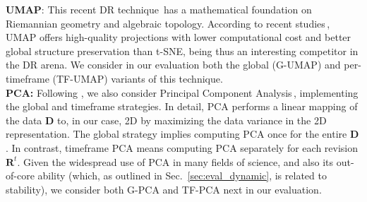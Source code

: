 \noindent\textbf{UMAP}: This recent DR technique\,\citep{umap} has a mathematical foundation on Riemannian geometry and algebraic topology. According to recent studies\,\citep{Espadoto19,Becht2019}, UMAP offers high-quality projections with lower computational cost and better global structure preservation than t-SNE, being thus an interesting competitor in the DR arena.  We consider in our evaluation both the global (G-UMAP) and per-timeframe (TF-UMAP) variants of this technique.\\


\noindent\textbf{PCA:} Following \citep{Fujiwara2019,Mao2007,Ward2011}, we also consider Principal Component Analysis\,\citep{pca}, implementing the global and timeframe strategies. In detail, PCA performs a linear mapping of the data $\mathbf{D}$ to, in our case, 2D by maximizing the data variance in the 2D representation. The global strategy implies computing PCA once for the entire $\mathbf{D}$. In contrast, timeframe PCA means computing PCA separately for each revision $\mathbf{R}^t$. Given the widespread use of PCA in many fields of science, and also its out-of-core ability (which, as outlined in Sec.~\ref{sec:eval_dynamic}, is related to stability), we consider both G-PCA and TF-PCA next in our evaluation.\\

